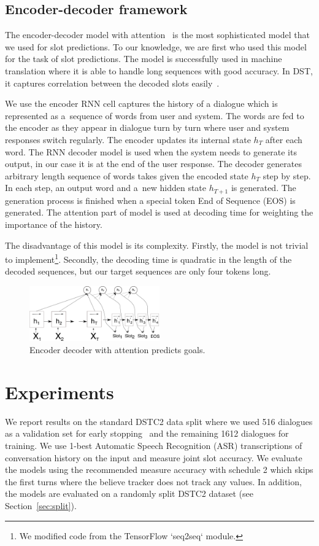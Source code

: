 \documentclass{itatnew}
\def\PB#1{\textcolor{red}{PB: \textit{#1}}}
\begin{document}
\subsection{Encoder-decoder framework}
\label{sec:encdec}
The encoder-decoder model with attention~\cite{bahdanau2014neural} is the most sophisticated model that we used for slot predictions.
To our knowledge, we are first who used this model for the task of slot predictions.
The model is successfully used in machine translation where it is able to handle long sequences with good accuracy.
In DST, it captures correlation between the decoded slots easily~\cite{bahdanau2014neural}. 

We use the encoder RNN cell captures the history of a dialogue which is represented as a~sequence of words from user and system.
The words are fed to the encoder as they appear in dialogue turn by turn where user and system responses switch regularly.
The encoder updates its internal state $h_T$ after each word.
The RNN decoder model is used when the system needs to generate its output, in our case it is at the end of the user response.
The decoder generates arbitrary length sequence of words takes given the encoded state $h_T$ step by step.
In each step, an output word and a~new hidden state $h_{T+1}$ is generated.
The generation process is finished when a special token End of Sequence (EOS) is generated.
The attention part of model is used at decoding time for weighting the importance of the history. 

The disadvantage of this model is its complexity.
Firstly, the model is not trivial to implement\footnote{We modified code from the TensorFlow `seq2seq` module.}. 
Secondly, the decoding time is quadratic in the length of the decoded sequences, but our target sequences are only four tokens long.
\begin{figure}
\includegraphics[width=0.5\textwidth]{encdec}
\caption{Encoder decoder with attention predicts goals.}
\label{fig:encdec}
\end{figure}

\section{Experiments}\label{sec:exp}
We report results on the standard DSTC2 data split where we used 516 dialogues as a validation set for early stopping~\cite{prechelt1998early} and the remaining 1612 dialogues for training.
We use 1-best Automatic Speech Recognition (ASR) transcriptions of conversation history on the input and measure joint slot accuracy.
We evaluate the models using the recommended measure accuracy with schedule 2 which skips the first turns where the believe tracker does not track any values. 
In addition, the models are evaluated on a randomly split DSTC2 dataset (see Section~\ref{sec:split}).
\end{document}

